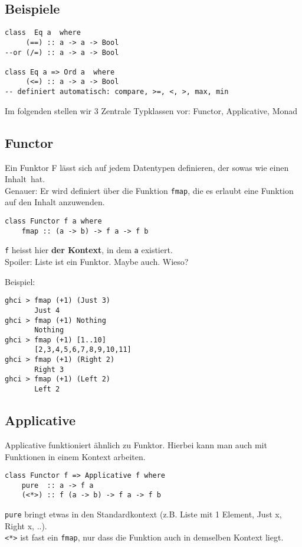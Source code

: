 \documentclass{beamer}
\begin{document}
\subsection{Beispiele}
\begin{frame}[fragile]
\begin{verbatim}
class  Eq a  where
     (==) :: a -> a -> Bool
--or (/=) :: a -> a -> Bool

class Eq a => Ord a  where
     (<=) :: a -> a -> Bool
-- definiert automatisch: compare, >=, <, >, max, min
\end{verbatim}
\pause
Im folgenden stellen wir 3 Zentrale Typklassen vor: Functor, Applicative, Monad
\end{frame}

\subsection{Functor}
\begin{frame}[fragile]
 Ein Funktor F lässt sich auf jedem Datentypen definieren, der sowas wie einen \glqq Inhalt\grqq \ hat.\\
 \pause
 Genauer: Er wird definiert über die Funktion \texttt{fmap}, die es erlaubt eine Funktion auf den Inhalt anzuwenden.
 \begin{verbatim}
class Functor f a where
    fmap :: (a -> b) -> f a -> f b
 \end{verbatim}
 \texttt{f} heisst hier \textbf{der Kontext}, in dem \texttt{a} existiert.\\
\pause
\bigskip
Spoiler: Liste ist ein Funktor. Maybe auch. Wieso?
\end{frame}

\begin{frame}[fragile]
Beispiel:
\begin{verbatim}
ghci > fmap (+1) (Just 3)
       Just 4
ghci > fmap (+1) Nothing
       Nothing
ghci > fmap (+1) [1..10]
       [2,3,4,5,6,7,8,9,10,11]
ghci > fmap (+1) (Right 2)
       Right 3
ghci > fmap (+1) (Left 2)
       Left 2
\end{verbatim}
\end{frame}

\subsection{Applicative}
\begin{frame}[fragile]
Applicative funktioniert ähnlich zu Funktor. Hierbei kann man auch mit Funktionen in einem Kontext arbeiten.\\
\pause
\begin{verbatim}
class Functor f => Applicative f where
    pure  :: a -> f a
    (<*>) :: f (a -> b) -> f a -> f b
\end{verbatim}
\pause
\texttt{pure} bringt etwas in den Standardkontext (z.B. Liste mit 1 Element, Just x, Right x, ..).\\
\texttt{<*>} ist fast ein \texttt{fmap}, nur dass die Funktion auch in demselben Kontext liegt.
\end{frame}
\end{document}

